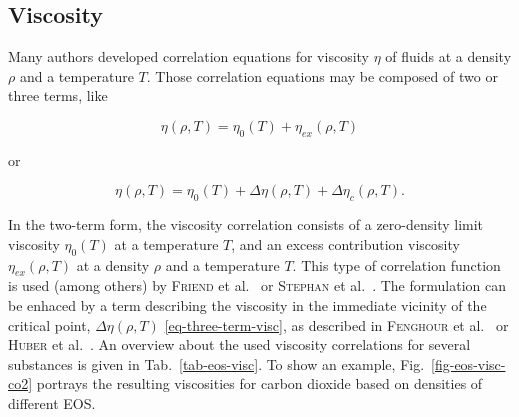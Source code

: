        
\subsection {Viscosity} \label{sec-viscosity}
Many authors developed correlation equations for viscosity $\eta$ of fluids at a density $\rho$ and a temperature $T$. Those correlation equations may be composed of two or three terms, like

\begin{equation}
\eta (\rho,T) = \eta_{0} (T) + \eta_{ex} (\rho,T)
	\label{eq-two-term-visc}
\end{equation}

or

\begin{equation}
\eta (\rho,T) = \eta_{0} (T) + \Delta \eta (\rho,T) + \Delta \eta_c (\rho,T).
	\label{eq-three-term-visc}
\end{equation}


In the two-term form, the viscosity correlation consists of a zero-density limit viscosity $\eta_0(T)$ at a temperature $T$, and an excess contribution viscosity $\eta_{ex}(\rho,T)$ at a density $\rho$ and a temperature $T$. This type of correlation function is used (among others) by \textsc{Friend} et al.\ \cite{FriElyIng:89} or \textsc{Stephan} et al.\ \cite{SteKraLae:87}. The formulation can be enhaced by a term describing the viscosity in the immediate vicinity of the critical point, $\Delta \eta (\rho,T)$ \eqref{eq-three-term-visc}, as described in \textsc{Fenghour} et al.\ \cite{FenWakVes:98} or \textsc{Huber} et al.\ \cite{IAPWS:08a}. An overview about the used viscosity correlations for several substances is given in Tab.~\ref{tab-eos-visc}. To show an example, Fig.~\ref{fig-eos-visc-co2} portrays the resulting viscosities for carbon dioxide based on densities of different EOS.


